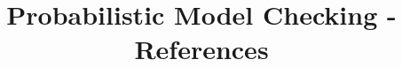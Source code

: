 \documentclass[[11pt]{article}
\begin{document}

\noindent

\title{Probabilistic Model Checking - References}
\author{}
\date{}
\maketitle

\nocite{ACD93}
\nocite{AD94}
\nocite{AH99}
\nocite{AHK03}
\nocite{AHL05}
\nocite{ASB+95}
\nocite{ASSB00}
\nocite{BCM+05}
\nocite{BdA95}
\nocite{BGC04}
\nocite{BHHK03}
\nocite{BK98}
\nocite{BK08}
\nocite{BP05}
\nocite{Bry86}
\nocite{BT91}
\nocite{Che06}
\nocite{CVGO06}
\nocite{CY88}
\nocite{CY95}
\nocite{dAHJ01}
\nocite{dAKN+00}
\nocite{dA97a}
\nocite{Dil89}
\nocite{DGV99}
\nocite{DHS03}
\nocite{DJJL01}
\nocite{DKN02}
\nocite{DKN+07}
\nocite{DKNP06}
\nocite{DM06}
\nocite{DN04}
\nocite{DP03}
\nocite{EGL85}
\nocite{EKVY07}
\nocite{Fru06}
\nocite{GNB+06}
\nocite{HHK00}
\nocite{HJ94}
\nocite{HK07}
\nocite{HK07b}
\nocite{HKN+06}
\nocite{HMP92}
\nocite{KKZJ07}
\nocite{KNP04a}
\nocite{KNP06a}
\nocite{KNP06b}
\nocite{KNP07a}
\nocite{KNPS06}
\nocite{KNS01b}
\nocite{KNS03b}
\nocite{KNSS02}
\nocite{KNSW04}
\nocite{KNSW07}
\nocite{KSK76}
\nocite{LHP06}
\nocite{Meh04b}
\nocite{NPK+05}
\nocite{NS06}
\nocite{NSY92}
\nocite{Par02}
\nocite{Shm04}
\nocite{SMA+07}
\nocite{SS01}
\nocite{Ste06}
\nocite{Sto02}
\nocite{SV99}
\nocite{Var85}
\nocite{VW94}
\nocite{WK05}
\nocite{YS02}
\nocite{ZPK05a}


\end{document}
